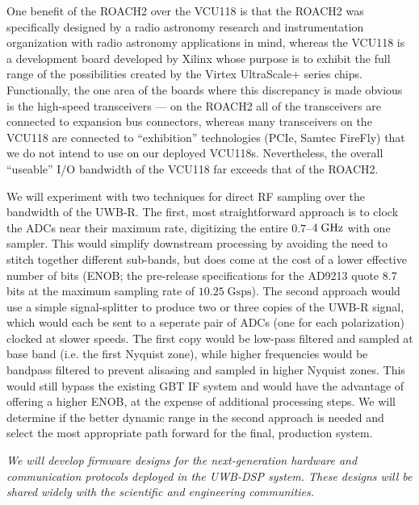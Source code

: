 \documentclass[10pt]{myNSF}
\begin{document}
One benefit of the ROACH2 over the VCU118 is that the ROACH2 was
specifically designed by a radio astronomy research and
instrumentation organization with radio astronomy applications in
mind, whereas the VCU118 is a development board developed by Xilinx
whose purpose is to exhibit the full range of the possibilities
created by the Virtex UltraScale+ series chips. Functionally, the one
area of the boards where this discrepancy is made obvious is the
high-speed transceivers --- on the ROACH2 all of the transceivers are
connected to expansion bus connectors, whereas many transceivers on
the VCU118 are connected to ``exhibition'' technologies (PCIe, Samtec
FireFly) that we do not intend to use on our deployed
VCU118s. Nevertheless, the overall ``useable'' I/O bandwidth of the
VCU118 far exceeds that of the ROACH2.

We will experiment with two techniques for direct RF sampling over the
bandwidth of the UWB-R.  The first, most straightforward approach is
to clock the ADCs near their maximum rate, digitizing the entire
$0.7$--$4\; \textrm{GHz}$ with one sampler.  This would simplify downstream
processing by avoiding the need to stitch together different
sub-bands, but does come at the cost of a lower effective number of
bits (ENOB; the pre-release specifications for the AD9213 quote 8.7
bits at the maximum sampling rate of $10.25\; \mathrm{Gsps}$).  The
second approach would use a simple signal-splitter to produce two or
three copies of the UWB-R signal, which would each be sent to a
seperate pair of ADCs (one for each polarization) clocked at slower
speeds.  The first copy would be low-pass filtered and sampled at base
band (i.e. the first Nyquist zone), while higher frequencies would be
bandpass filtered to prevent alisasing and sampled in higher Nyquist
zones.  This would still bypass the existing GBT IF system and would
have the advantage of offering a higher ENOB, at the expense of
additional processing steps.  We will determine if the better dynamic
range in the second approach is needed and select the most appropriate
path forward for the final, production system.

\label{sec:firmware}

\emph{We will develop firmware designs for the next-generation
  hardware and communication protocols deployed in the UWB-DSP system.
  These designs will be shared widely with the scientific and
  engineering communities.}
\end{document}
